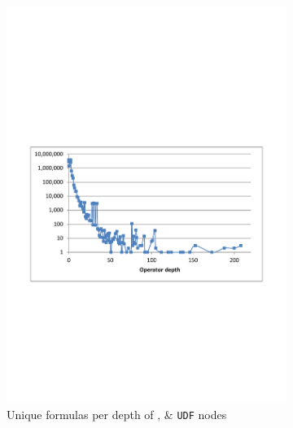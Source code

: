 \documentclass[times]{smrauth}
\begin{document}
\begin{figure}
	\begin{subfigure}[b]{0.49\textwidth}
		\centering
		\includegraphics[width=1\textwidth]{img/depths3}
		\caption{Unique formulas per depth of ,  \& \texttt{UDF} nodes}
		\label{fig:depthOperator}
	\end{subfigure}
	~
	\begin{subfigure}[b]{0.49\textwidth}
		\centering

\end{subfigure}
\end{figure}
\end{document}
